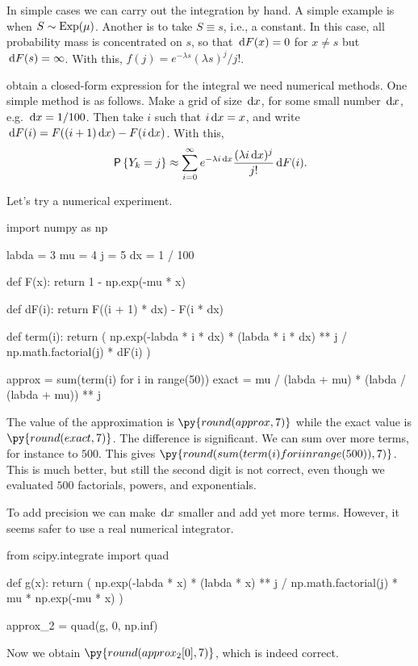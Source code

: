 In simple cases we can carry out the integration by hand.
A simple example is when $S\sim \operatorname{Exp}(\mu)$. Another is to take $S\equiv s$, i.e., a constant.
In this case, all probability mass is concentrated on $s$, so that $\,\textrm{d}F( x) = 0$ for $x\neq s$ but $\,\textrm{d}F(s) = \infty$.
With this, $f(j) = e^{-\lambda s}(\lambda s)^j/{j!}$.

 obtain a closed-form expression for the integral we need numerical methods.
One simple method is as follows.
Make a grid of size $\,\textrm{d}x$, for some small number $\,\textrm{d}x$, e.g.
$\,\textrm{d}x=1/100$. Then  take $i$ such that $i \,\textrm{d}x = x$, and  write $\,\textrm{d}F(i ) =  F((i+1)\,\textrm{d}x) - F(i \,\textrm{d}x)$.
With this,
 \begin{equation*}
 \,\mathsf{P}\left\{Y_k = j\right\}  \approx \sum_{i=0}^\infty e^{-\lambda i \,\textrm{d}x}\frac{(\lambda i\,\textrm{d}x)^j}{j!} \,\textrm{d}F(i).
\end{equation*}

Let's try a numerical experiment.
\begin{pyblock}
import numpy as np

labda = 3
mu = 4
j = 5
dx = 1 / 100


def F(x):
    return 1 - np.exp(-mu * x)


def dF(i):
    return F((i + 1) * dx) - F(i * dx)


def term(i):
    return (
        np.exp(-labda * i * dx)
        * (labda * i * dx) ** j
        / np.math.factorial(j)
        * dF(i)
    )


approx = sum(term(i) for i in range(50))
exact = mu / (labda + mu) * (labda / (labda + mu)) ** j
\end{pyblock}
The value of the approximation is $\py{round(approx, 7)}$ while the exact value is $\py{round(exact, 7)}$.
The difference is significant.
We can sum over more terms, for instance to $500$.
This gives $\py{round(sum(term(i) for i in range(500)),7)}$.
This is much better, but still the second digit is not correct, even though we evaluated $500$ factorials, powers, and exponentials.

To add precision we can make $\,\textrm{d}x$ smaller and add yet more terms.
However, it seems safer to use a real numerical integrator.
\begin{pyblock}
from scipy.integrate import quad

def g(x):
    return (
        np.exp(-labda * x)
        * (labda * x) ** j
        / np.math.factorial(j)
        * mu
        * np.exp(-mu * x)
    )

approx_2 = quad(g, 0, np.inf)
\end{pyblock}
Now we obtain $\py{round(approx_2[0], 7)}$, which is indeed correct.


